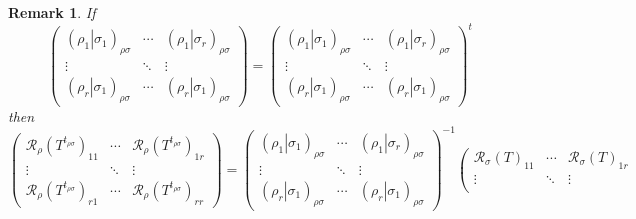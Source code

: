 \documentclass[aps,preprint]{revtex4}
\newtheorem{remark}[theorem]{Remark}
\begin{document}
\begin{remark}
If 
\begin{equation}
\left( 
\begin{array}{ccc}
\left( \left. \rho _{1}\right\vert \sigma _{1}\right) _{\rho \sigma } & 
\cdots & \left( \left. \rho _{1}\right\vert \sigma _{r}\right) _{\rho \sigma
} \\ 
\vdots & \ddots & \vdots \\ 
\left( \left. \rho _{r}\right\vert \sigma _{1}\right) _{\rho \sigma } & 
\cdots & \left( \left. \rho _{r}\right\vert \sigma _{1}\right) _{\rho \sigma
}%
\end{array}%
\right) =\left( 
\begin{array}{ccc}
\left( \left. \rho _{1}\right\vert \sigma _{1}\right) _{\rho \sigma } & 
\cdots & \left( \left. \rho _{1}\right\vert \sigma _{r}\right) _{\rho \sigma
} \\ 
\vdots & \ddots & \vdots \\ 
\left( \left. \rho _{r}\right\vert \sigma _{1}\right) _{\rho \sigma } & 
\cdots & \left( \left. \rho _{r}\right\vert \sigma _{1}\right) _{\rho \sigma
}%
\end{array}%
\right) ^{t}
\end{equation}%
then 
\begin{equation}
\left( 
\begin{array}{ccc}
\mathcal{R}_{\rho }\left( T^{t_{\rho \sigma }}\right) _{11} & \cdots & 
\mathcal{R}_{\rho }\left( T^{t_{\rho \sigma }}\right) _{1r} \\ 
\vdots & \ddots & \vdots \\ 
\mathcal{R}_{\rho }\left( T^{t_{\rho \sigma }}\right) _{r1} & \cdots & 
\mathcal{R}_{\rho }\left( T^{t_{\rho \sigma }}\right) _{rr}%
\end{array}%
\right) =\left( 
\begin{array}{ccc}
\left( \left. \rho _{1}\right\vert \sigma _{1}\right) _{\rho \sigma } & 
\cdots & \left( \left. \rho _{1}\right\vert \sigma _{r}\right) _{\rho \sigma
} \\ 
\vdots & \ddots & \vdots \\ 
\left( \left. \rho _{r}\right\vert \sigma _{1}\right) _{\rho \sigma } & 
\cdots & \left( \left. \rho _{r}\right\vert \sigma _{1}\right) _{\rho \sigma
}%
\end{array}%
\right) ^{-1}\left( 
\begin{array}{ccc}
\mathcal{R}_{\sigma }\left( T\right) _{11} & \cdots & \mathcal{R}_{\sigma
}\left( T\right) _{1r} \\ 
\vdots & \ddots & \vdots \\ 

\end{array}
\end{equation}
\end{remark}
\end{document}
